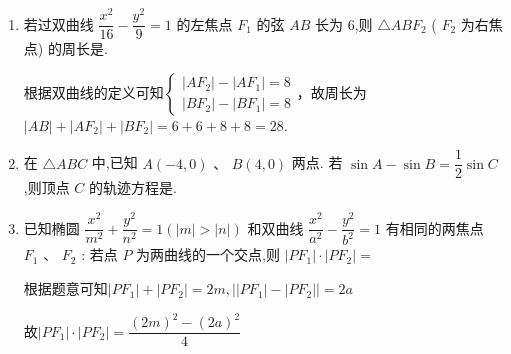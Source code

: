 \begin{enumerate}
\begin{jieda}
\begin{dingautolist}{172}
        \end{dingautolist}
        \ps 直接求解$\left\{  \begin{array}{l} \dfrac{{\left( s - 3\right) }^{2}}{4} + \dfrac{{t}^{2}}{4} = 9 \\  \dfrac{{s}^{2}}{4} - \dfrac{{t}^{2}}{5} = 1  \\  t > 0 \end{array}\right.$即可得$P$在一二两个象限的坐标$(s, t)$.
    \end{jieda}

    \item 若过双曲线 $\dfrac{{x}^{2}}{16} - \dfrac{{y}^{2}}{9} = 1$ 的左焦点 ${{F}}_{1}$ 的弦 ${{AB}}$ 长为 6,则 $\bigtriangleup  {AB}{F}_{2}$ ( ${{F}}_{2}$ 为右焦点) 的周长是.
    \begin{jieda}
        根据双曲线的定义可知$\left\{\begin{array}{l}
             |AF_2| - |AF_1| = 8 \\
             |BF_2| - |BF_1| = 8
        \end{array}\right.$，故周长为$|AB|+|AF_2|+|BF_2| = 6+6+8+8 = 28$.
    \end{jieda}

    \item 在 $\bigtriangleup {ABC}$ 中,已知 $A\left( {-4,0}\right) \text{ 、 }B\left( {4,0}\right)$ 两点. 若 $\sin A - \sin B = \dfrac{1}{2}\sin C$ ,则顶点 $C$ 的轨迹方程是.

    \item 已知椭圆 $\dfrac{{x}^{2}}{{m}^{2}} + \dfrac{{y}^{2}}{{n}^{2}} = 1\left( {\left| m\right|  > \left| n\right| }\right)$ 和双曲线 $\dfrac{{x}^{2}}{{a}^{2}} - \dfrac{{y}^{2}}{{b}^{2}} = 1$ 有相同的两焦点 ${F}_{1}\text{ 、 }{F}_{2}$ : 若点 $P$ 为两曲线的一个交点,则 $\left| {P{F}_{1}}\right|  \cdot  \left| {P{F}_{2}}\right|  =$
    \begin{jieda}
        根据题意可知$\left| {P{F}_{1}}\right|  +  \left| {P{F}_{2}}\right| = 2m, \left|\left| {P{F}_{1}}\right|  -  \left| {P{F}_{2}}\right|\right| = 2a$
        
        故$\left| {P{F}_{1}}\right|  \cdot  \left| {P{F}_{2}}\right| = \dfrac{(2m)^2 - (2a)^2}{4}$
    \end{jieda}
    

\end{enumerate}
